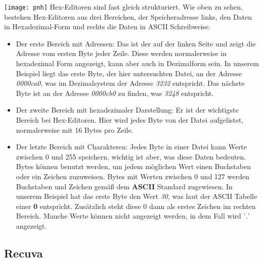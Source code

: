 \documentclass[10pt,a4paper]{article} %
\begin{document}
\texttt{[image: pnh]}
\newline
\newline
Hex-Editoren sind fast gleich strukturiert. Wie oben zu sehen, bestehen Hex-Editoren aus drei Bereichen,
der Speicheradresse links, den Daten in Hexadezimal-Form und rechts die Daten in ASCII Schreibweise.
\begin{itemize}
\item
Der erste Bereich mit Adressen: Das ist der auf der linken Seite und zeigt die Adresse vom ersten Byte jeder Zeile. Diese werden normalerweise in hexadezimal Form angezeigt, kann aber auch in Dezimalform sein. In unserem Beispiel liegt das erste Byte, der hier untersuchten Datei, an der Adresse \textit{0000ca0}, was im Dezimalsystem der Adresse  \textit{3232} entspricht. Das nächste Byte ist an der Adresse \textit{0000cb0} zu finden, was \textit{3248} entspricht.\cite{explain_hex}

\item
Der zweite Bereich mit hexadezimaler Darstellung: Er ist der wichtigste Bereich bei Hex-Editoren.
Hier wird jedes Byte von der Datei aufgelistet, normalerweise mit 16 Bytes pro Zeile.

\item
Der letzte Bereich mit Charakteren: Jedes Byte in einer Datei kann Werte zwischen 0 und 255 speichern, wichtig ist aber, was diese Daten bedeuten. Bytes können benutzt werden, um jedem möglichen Wert einen Buchstaben oder ein Zeichen zuzuweisen. Bytes mit Werten zwischen 0 und 127 werden Buchstaben und Zeichen gemäß dem \textbf{ASCII} Standard zugewiesen. In unserem Beispiel hat das erste Byte den Wert \textit{30}, was laut der ASCII Tabelle einer \textbf{0} entspricht. Zusätzlich steht diese 0 dann als erstes Zeichen im rechten Bereich. Manche Werte können nicht angezeigt werden, in dem Fall wird '\textit{.}' angezeigt.
\end{itemize}
\newpage
\subsection{Recuva}
\end{document}
